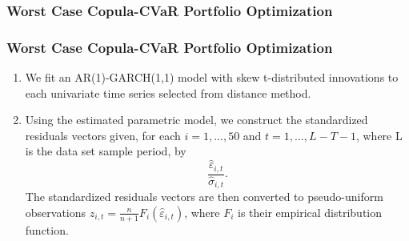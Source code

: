 \documentclass[pdf,10pt,xcolor=dvipsnames,hide notes]{beamer}
\begin{document}
\subsubsection{Worst Case Copula-CVaR Portfolio Optimization}
\begin{frame}[label=frame5]
\frametitle{Worst Case Copula-CVaR Portfolio Optimization}

\begin{enumerate}
	\setcounter{enumi}{0}
\justifying
\item We fit an AR(1)-GARCH(1,1) model with skew t-distributed
innovations to each univariate time series selected from distance method.

\vspace{0.3cm}

\item Using the estimated parametric model, we construct the standardized
residuals vectors given, for each $i=1,...,50$ and $t=1,...,L-T-1$, where L is the data set sample period, by
\begin{equation*}
\frac{\widehat{\varepsilon }_{i,t}}{\widehat{\sigma }_{i,t}}.
\end{equation*}%
The standardized residuals vectors are then converted to pseudo-uniform
observations $z_{i,t}=\frac{n}{n+1}F_{i}\left( \widehat{\varepsilon }%
_{i,t}\right) $, where $F_{i}$ is their empirical distribution function.

 
 \end{enumerate}

\end{frame}
\end{document}
